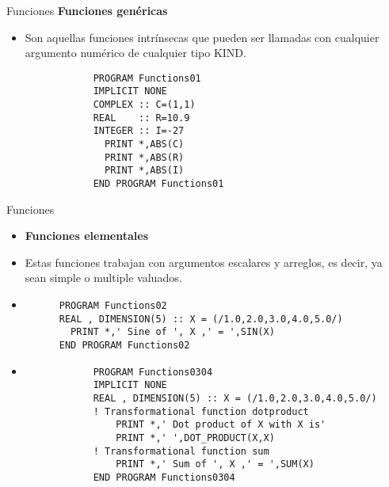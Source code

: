 \begin{frame}[fragile]{Funciones}
\textbf{Funciones genéricas}
 \begin{itemize}[<+(1)->]
  \item Son aquellas funciones intrínsecas que pueden ser llamadas con cualquier argumento numérico de cualquier tipo KIND.
    \vspace{0.1cm}
        \begin{verbatim}
            PROGRAM Functions01
            IMPLICIT NONE
            COMPLEX :: C=(1,1)
            REAL    :: R=10.9
            INTEGER :: I=-27
              PRINT *,ABS(C)
              PRINT *,ABS(R)
              PRINT *,ABS(I)
            END PROGRAM Functions01
        \end{verbatim}
 \end{itemize}
\end{frame}

\begin{frame}[fragile]{Funciones}
 \begin{itemize}[<+(0)->]
  \item [] \textbf{Funciones elementales}
  \item Estas funciones trabajan con argumentos escalares y arreglos, es decir, ya sean simple o multiple valuados.
  \vspace{0.15cm}
  \item[]
      \begin{verbatim}
      PROGRAM Functions02
      REAL , DIMENSION(5) :: X = (/1.0,2.0,3.0,4.0,5.0/)
        PRINT *,' Sine of ', X ,' = ',SIN(X)
      END PROGRAM Functions02
      \end{verbatim}
  \vspace{0.15cm}
  \item [] 
        \begin{verbatim}
            PROGRAM Functions0304     
            IMPLICIT NONE
            REAL , DIMENSION(5) :: X = (/1.0,2.0,3.0,4.0,5.0/)
            ! Transformational function dotproduct
                PRINT *,' Dot product of X with X is'
                PRINT *,' ',DOT_PRODUCT(X,X)
            ! Transformational function sum
                PRINT *,' Sum of ', X ,' = ',SUM(X)
            END PROGRAM Functions0304
        \end{verbatim}
 \end{itemize}
\end{frame}

